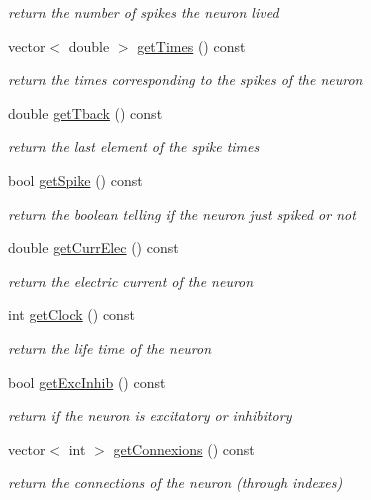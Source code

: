 \begin{DoxyCompactItemize}
\begin{DoxyCompactList}\small\item\em return the number of spikes the neuron lived \end{DoxyCompactList}\item 
vector$<$ double $>$ \hyperlink{classNeuron_ae78f9ef057b2388e388d8c15343b5644}{get\-Times} () const 
\begin{DoxyCompactList}\small\item\em return the times corresponding to the spikes of the neuron \end{DoxyCompactList}\item 
double \hyperlink{classNeuron_ace97a76a0c9baaefb7985439ed4784b8}{get\-Tback} () const 
\begin{DoxyCompactList}\small\item\em return the last element of the spike times \end{DoxyCompactList}\item 
bool \hyperlink{classNeuron_a9c7aefda240dcf3ebdfc946c4e5925d7}{get\-Spike} () const 
\begin{DoxyCompactList}\small\item\em return the boolean telling if the neuron just spiked or not \end{DoxyCompactList}\item 
double \hyperlink{classNeuron_ade3e91e8b14dddd572bdf7cba46b0770}{get\-Curr\-Elec} () const 
\begin{DoxyCompactList}\small\item\em return the electric current of the neuron \end{DoxyCompactList}\item 
int \hyperlink{classNeuron_ae5895ea008a267e0e834c35c8cd2cd68}{get\-Clock} () const 
\begin{DoxyCompactList}\small\item\em return the life time of the neuron \end{DoxyCompactList}\item 
bool \hyperlink{classNeuron_a0c1fb45caebd2868e5a7b26bad3a9714}{get\-Exc\-Inhib} () const 
\begin{DoxyCompactList}\small\item\em return if the neuron is excitatory or inhibitory \end{DoxyCompactList}\item 
vector$<$ int $>$ \hyperlink{classNeuron_a6acfebdeeff3f3105caf2e05a55d2c2d}{get\-Connexions} () const 
\begin{DoxyCompactList}\small\item\em return the connections of the neuron (through indexes) \end{DoxyCompactList}\item 

\end{DoxyCompactItemize}
